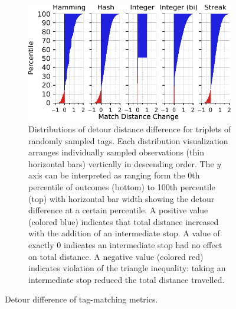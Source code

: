 \begin{figure}
\begin{center}
\begin{minipage}{\linewidth}
\begin{subfigure}[b]{\linewidth}
\includegraphics[width=\linewidth]{img/detour_difference/bitweight=0dot5+seed=1+title=low-triplet-analysis+_data_hathash_hash=6b0749ef97a58721+_script_fullcat_hash=2ded962cad675fe3+ext=}
\caption{
Distributions of detour distance difference for triplets of randomly sampled tags.
Each distribution visualization arranges individually sampled observations (thin horizontal bars) vertically in descending order.
The $y$ axis can be interpreted as ranging form the 0th percentile of outcomes (bottom) to 100th percentile (top) with horizontal bar width showing the detour difference at a certain percentile.
A positive value (colored blue) indicates that total distance increased with the addition of an intermediate stop.
A value of exactly 0 indicates an intermediate stop had no effect on total distance.
A negative value (colored red) indicates violation of the triangle inequality: taking an intermediate stop reduced the total distance travelled.
} \label{fig:detour_difference_distribution}

\end{subfigure}
\end{minipage}

\caption{
Detour difference of tag-matching metrics.
}
\label{fig:detour_difference}

\end{center}
\end{figure}
